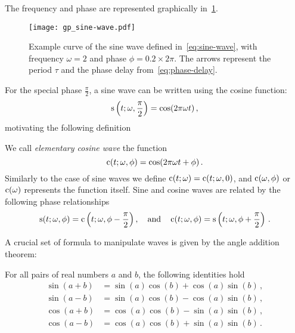 The frequency and phase are represented graphically in~\cref{fig:sine-wave}.
\begin{figure}[t]
  \centering
  \texttt{[image: gp\_sine-wave.pdf]}
  \caption{Example curve of the sine wave defined in~\cref{eq:sine-wave}, with frequency
    $\omega=2$ and phase $\phi=0.2\times 2\pi$. The arrows represent the period $\tau$ and
  the phase delay from~\cref{eq:phase-delay}.}
  \label{fig:sine-wave}
\end{figure}
For the special phase $\frac{\pi}{2}$, a sine wave can be written using the cosine
function:
\begin{equation}
  \operatorname{s}\left(t;\omega,\frac{\pi}{2}\right)= \cos(2\pi\omega t)\,,
\end{equation}
motivating the following definition
\begin{definition}
  \label{def:cosine-wave}
  We call \emph{elementary cosine wave} the function
  \begin{equation}
    \operatorname{c}(t;\omega,\phi)=\cos(2\pi\omega t + \phi)\,.\label{eq:cosine-wave}
  \end{equation}
  Similarly to the case of sine waves we define $\operatorname{c}(t;\omega)=\operatorname{c}(t;\omega,0)$, and
  $\operatorname{c}(\omega,\phi)$ or $\operatorname{c}(\omega)$ represents the function itself. Sine and cosine
  waves are related by the following phase relationships
  \begin{equation}
    \operatorname{s}(t;\omega,\phi)=\operatorname{c}\left(t;\omega,\phi-\frac{\pi}{2}\right),
    \quad\text{and}\quad
    \operatorname{c}(t;\omega,\phi)=\operatorname{s}\left(t;\omega,\phi+\frac{\pi}{2}\right)\,.
  \end{equation}
\end{definition}
A crucial set of formula to manipulate waves is given by the angle addition theorem:
\begin{theorem}
  \label{thm:angle-add}
  For all pairs of real numbers $a$ and $b$, the following identities hold
  \begin{align}
    \sin(a+b)&=\sin(a)\cos(b)+\cos(a)\sin(b)\,,\label{eq:sinapb}\\
    \sin(a-b)&=\sin(a)\cos(b)-\cos(a)\sin(b)\,,\label{eq:sinamb}\\
    \cos(a+b)&=\cos(a)\cos(b)-\sin(a)\sin(b)\,,\label{eq:cosapb}\\
    \cos(a-b)&=\cos(a)\cos(b)+\sin(a)\sin(b)\,.\label{eq:cosamb}
  \end{align}
\end{theorem}
